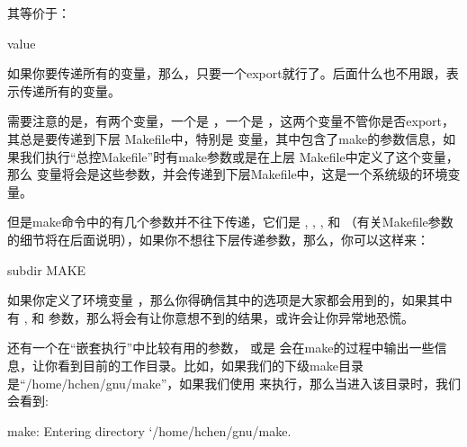 \documentclass[a4paper,10pt]{sphinxmanual}
\begin{document}
其等价于：

\begin{sphinxVerbatim}[commandchars=\\\{\}]
  value
 
\end{sphinxVerbatim}

如果你要传递所有的变量，那么，只要一个export就行了。后面什么也不用跟，表示传递所有的变量。

需要注意的是，有两个变量，一个是  ，一个是  ，这两个变量不管你是否export，其总是要传递到下层 Makefile中，特别是  变量，其中包含了make的参数信息，如果我们执行“总控Makefile”时有make参数或是在上层 Makefile中定义了这个变量，那么
 变量将会是这些参数，并会传递到下层Makefile中，这是一个系统级的环境变量。

但是make命令中的有几个参数并不往下传递，它们是  ,  , ,  和
 （有关Makefile参数的细节将在后面说明），如果你不想往下层传递参数，那么，你可以这样来：

\begin{sphinxVerbatim}[commandchars=\\\{\}]
     subdir  MAKE 
\end{sphinxVerbatim}

如果你定义了环境变量  ，那么你得确信其中的选项是大家都会用到的，如果其中有
 ,  和  参数，那么将会有让你意想不到的结果，或许会让你异常地恐慌。

还有一个在“嵌套执行”中比较有用的参数，  或是  会在make的过程中输出一些信息，让你看到目前的工作目录。比如，如果我们的下级make目录是“/home/hchen/gnu/make”，如果我们使用  来执行，那么当进入该目录时，我们会看到:

\begin{sphinxVerbatim}[commandchars=\\\{\}]
make: Entering directory {}`/home/hchen/gnu/make\PYGZsq{}.
\end{sphinxVerbatim}
\end{document}
